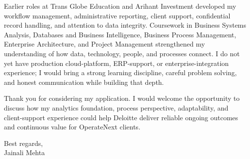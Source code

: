 \documentclass[letterpaper,11pt]{article}
\begin{document}
\bigbreak
Earlier roles at Trans Globe Education and Arihant Investment developed my workflow management, administrative reporting, client support, confidential record handling, and attention to data integrity. Coursework in Business Systems Analysis, Databases and Business Intelligence, Business Process Management, Enterprise Architecture, and Project Management strengthened my understanding of how data, technology, people, and processes connect. I do not yet have production cloud-platform, ERP-support, or enterprise-integration experience; I would bring a strong learning discipline, careful problem solving, and honest communication while building that depth.

\bigbreak
Thank you for considering my application. I would welcome the opportunity to discuss how my analytics foundation, process perspective, adaptability, and client-support experience could help Deloitte deliver reliable ongoing outcomes and continuous value for OperateNext clients.

\bigbreak
Best regards,\\
Jainali Mehta
\end{document}

